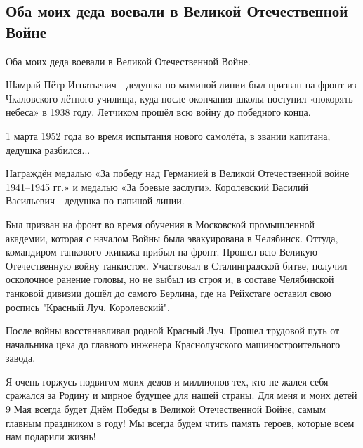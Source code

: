  
 
 
 
 

\subsection{Оба моих деда воевали в Великой Отечественной Войне}

Оба моих деда воевали в Великой Отечественной Войне. 

Шамрай Пётр Игнатьевич - дедушка по маминой линии был призван на фронт из
Чкаловского лётного училища, куда после окончания школы поступил «покорять
небеса» в 1938 году. Летчиком прошёл всю войну до победного конца. 

1 марта 1952 года во время испытания нового самолёта, в звании капитана, дедушка разбился...

Награждён медалью «За победу над Германией в Великой Отечественной войне
1941–1945 гг.» и медалью «За боевые заслуги».  Королевский Василий Васильевич -
дедушка по папиной линии. 

Был призван на фронт во время обучения в Московской промышленной академии,
которая с началом Войны была эвакуирована в Челябинск. Оттуда, командиром
танкового экипажа прибыл на фронт. Прошел всю Великую Отечественную войну
танкистом. Участвовал в Сталинградской битве, получил осколочное ранение
головы, но не выбыл из строя и, в составе Челябинской танковой дивизии дошёл до
самого Берлина, где на Рейхстаге оставил свою роспись "Красный Луч.
Королевский". 

После войны восстанавливал родной Красный Луч. Прошел трудовой путь от
начальника цеха до главного инженера Краснолучского машиностроительного завода. 

Я очень горжусь подвигом моих дедов и миллионов тех, кто не жалея себя сражался
за Родину и мирное будущее для нашей страны. Для меня и моих детей 9 Мая всегда
будет Днём Победы в Великой Отечественной Войне, самым главным праздником в
году! Мы всегда будем чтить память героев, которые всем нам подарили жизнь!

